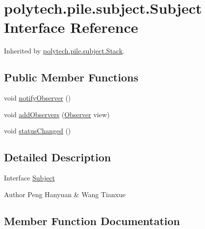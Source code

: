 \hypertarget{interfacepolytech_1_1pile_1_1subject_1_1_subject}{}\section{polytech.\+pile.\+subject.\+Subject Interface Reference}
\label{interfacepolytech_1_1pile_1_1subject_1_1_subject}


Inherited by \hyperlink{classpolytech_1_1pile_1_1subject_1_1_stack}{polytech.\+pile.\+subject.\+Stack}.

\subsection*{Public Member Functions}
\begin{DoxyCompactItemize}
\item 
void \hyperlink{interfacepolytech_1_1pile_1_1subject_1_1_subject_a4ae5fcf71f744b2f086d172e5922bc0d}{notify\+Observer} ()
\item 
void \hyperlink{interfacepolytech_1_1pile_1_1subject_1_1_subject_aea16ce079223e1d998880ffbea5a923f}{add\+Observers} (\hyperlink{interfacepolytech_1_1pile_1_1observers_1_1_observer}{Observer} view)
\item 
void \hyperlink{interfacepolytech_1_1pile_1_1subject_1_1_subject_a9bc972b992f152734a3b40cda13dc4d7}{status\+Changed} ()
\end{DoxyCompactItemize}


\subsection{Detailed Description}
Interface \hyperlink{interfacepolytech_1_1pile_1_1subject_1_1_subject}{Subject}

\begin{DoxyAuthor}{Author}
Peng Hanyuan \& Wang Tianxue 
\end{DoxyAuthor}


\subsection{Member Function Documentation}
\hypertarget{interfacepolytech_1_1pile_1_1subject_1_1_subject_aea16ce079223e1d998880ffbea5a923f}{}\label{interfacepolytech_1_1pile_1_1subject_1_1_subject_aea16ce079223e1d998880ffbea5a923f} 
